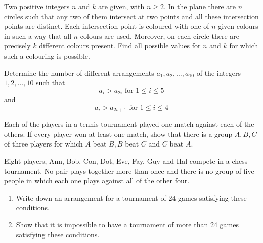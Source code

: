 \documentclass{pset}
\begin{document}
\begin{problems}
\begin{problem}[IrMO 2006 Q6]
\begin{center}

    \end{center}
\end{problem}

\begin{problem}[IrMO 2006 Q10]
    Two positive integers \(n\) and \(k\) are given, with \(n \geq 2 .\) In the plane there are \(n\) circles such that any two of them intersect at two points and all these intersection points are distinct. Each intersection point is coloured with one of \(n\) given colours in such
    a way that all \(n\) colours are used. Moreover, on each circle there are precisely \(k\)
    different colours present. Find all possible values for \(n\) and \(k\) for which such a colouring is possible.
\end{problem}

\begin{problem}[IrMO 2005 Q9]
    Determine the number of different arrangements \(a_{1}, a_{2}, \ldots, a_{10}\) of the integers \(1,2, \ldots, 10\) such that
    $$
    a_{i}>a_{2 i} \text { for } 1 \leq i \leq 5
    $$
    and
    $$
    a_{i}>a_{2 i+1} \text { for } 1 \leq i \leq 4
    $$
\end{problem}

\begin{problem}[IrMO 2004 Q2]
    Each of the players in a tennis tournament played one match against each of the others. If every player won at least one match, show that there is a group \(A, B, C\) of three players for which \(A\) beat \(B, B\) beat \(C\) and \(C\) beat \(A .\)
\end{problem}

\begin{problem}[IrMO 2003 Q4]
    Eight players, Ann, Bob, Con, Dot, Eve, Fay, Guy and Hal compete in a chess tournament. No pair plays together more than once and there is no group of five people in which each one plays against all of the other four.
    \begin{enumerate}
        \item Write down an arrangement for a tournament of 24 games satisfying these conditions.
        \item Show that it is impossible to have a tournament of more than 24 games satisfying these conditions.
    \end{enumerate}
\end{problem}


\end{problems}
\end{document}
